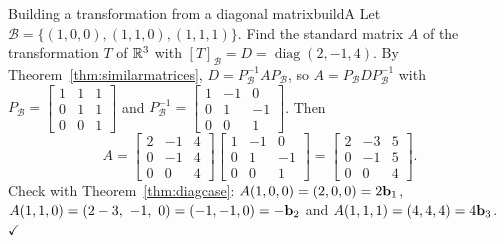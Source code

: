 \documentclass[11pt]{article}
\begin{document}
\begin{exmp}{Building a transformation from a diagonal matrix}{buildA}
Let $\mathcal{B}=\{(1,0,0),(1,1,0),(1,1,1)\}$. Find the standard matrix $A$ of the transformation $T$ of $\mathbb{R}^3$ with $[T]_{\mathcal{B}}=D=\operatorname{diag}(2,-1,4)$. By Theorem~\ref{thm:similarmatrices}, $D=P_{\mathcal{B}}^{-1}AP_{\mathcal{B}}$, so $A=P_{\mathcal{B}}DP_{\mathcal{B}}^{-1}$ with $P_{\mathcal{B}}=\begin{bmatrix}1&1&1\\0&1&1\\0&0&1\end{bmatrix}$ and $P_{\mathcal{B}}^{-1}=\begin{bmatrix}1&-1&0\\0&1&-1\\0&0&1\end{bmatrix}$. Then
\[
A=\begin{bmatrix}2&-1&4\\0&-1&4\\0&0&4\end{bmatrix}\begin{bmatrix}1&-1&0\\0&1&-1\\0&0&1\end{bmatrix}=\begin{bmatrix}2&-3&5\\0&-1&5\\0&0&4\end{bmatrix}.
\]
Check with Theorem~\ref{thm:diagcase}: $A(1,0,0)=(2,0,0)=2\mathbf{b}_1$, $A(1,1,0)=(2-3,\ -1,\ 0)=(-1,-1,0)=-\mathbf{b}_2$ and $A(1,1,1)=(4,4,4)=4\mathbf{b}_3$. \ $\checkmark$
\end{exmp}
\end{document}
